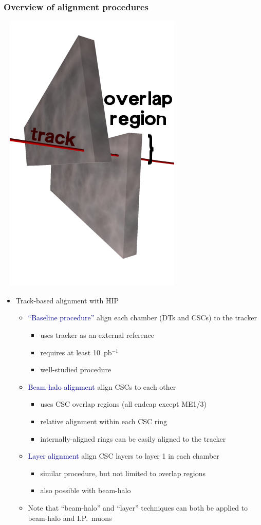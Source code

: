 \documentclass[compress]{beamer}
\begin{document}
\begin{frame}
\frametitle{Overview of alignment procedures}

\vspace{1.2 cm}
\mbox{ } \hfill \includegraphics[width=0.15\linewidth]{overlap.png}

\vspace{-3.8 cm}
\begin{itemize}
\item Track-based alignment with HIP

\begin{itemize}
\item \textcolor{darkblue}{``Baseline procedure''} align each chamber (DTs and CSCs) to the tracker
\begin{itemize}
\item uses tracker as an external reference
\item requires at least 10~pb$^{-1}$
\item well-studied procedure
\end{itemize}

\item \textcolor{darkblue}{Beam-halo alignment} align CSCs to each other
\begin{itemize}
\item uses CSC overlap regions (all endcap except ME1/3)
\item relative alignment within each CSC ring
\item internally-aligned rings can be easily aligned to the tracker
\end{itemize}

\item \textcolor{darkblue}{Layer alignment} align CSC layers to layer 1 in each chamber
\begin{itemize}
\item similar procedure, but not limited to overlap regions
\item also possible with beam-halo
\end{itemize}

\item Note that ``beam-halo'' and ``layer'' techniques can both be applied to beam-halo and I.P.\ muons
\end{itemize}


\end{itemize}
\end{frame}
\end{document}
